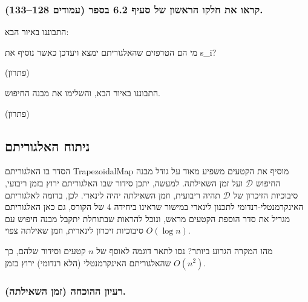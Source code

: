 \documentclass[
]{book}
\begin{document}
\hypertarget{ux5e7ux5e8ux5d0ux5d5-ux5d0ux5ea-ux5d7ux5dcux5e7ux5d5-ux5d4ux5e8ux5d0ux5e9ux5d5ux5df-ux5e9ux5dc-ux5e1ux5e2ux5d9ux5e3-6.2-ux5d1ux5e1ux5e4ux5e8-ux5e2ux5deux5d5ux5d3ux5d9ux5dd-128133.}{%
\subsubsection*{קראו את חלקו הראשון של סעיף 6.2 בספר (עמודים 128--133).}\label{ux5e7ux5e8ux5d0ux5d5-ux5d0ux5ea-ux5d7ux5dcux5e7ux5d5-ux5d4ux5e8ux5d0ux5e9ux5d5ux5df-ux5e9ux5dc-ux5e1ux5e2ux5d9ux5e3-6.2-ux5d1ux5e1ux5e4ux5e8-ux5e2ux5deux5d5ux5d3ux5d9ux5dd-128133.}}

התבוננו באיור הבא:

מי הם הטרפזים שהאלגוריתם ימצא ויעדכן כאשר נוסיף את s\_i?

(פתרון)

התבוננו באיור הבא, והשלימו את מבנה החיפוש.

(פתרון)

\hypertarget{alg-analysis}{%
\subsection{ניתוח האלגוריתם}\label{alg-analysis}}

הסדר בו האלגוריתם TrapezoidalMap מוסיף את הקטעים משפיע מאוד על גודל מבנה החיפוש \(\mathcal{D}\) ועל זמן השאילתה.
למעשה, יתכן סידור שבו האלגוריתם ירוץ בזמן ריבועי, סיבוכיות הזיכרון של \(\mathcal{D}\) תהיה ריבועית, וזמן השאילתה יהיה לינארי.
לכן, בדומה לאלגוריתם האינקרמנטלי-רנדומי לתכנון לינארי במישור שראינו ביחידה 4 של הקורס, גם כאן האלגוריתם מגריל את סדר הוספת הקטעים מראש, ונוכל להראות שבתוחלת יתקבל מבנה חיפוש עם סיבוכיות זיכרון לינארית, וזמן שאילתה צפוי \(O (\log n )\).

מהו המקרה הגרוע ביותר?
נסו לתאר דוגמה לאוסף של \(n\) קטעים וסידור שלהם, כך שהאלגוריתם האינקרמנטלי (הלא רנדומי) ירוץ בזמן \(O ( n^2 )\).

\hypertarget{ux5e8ux5e2ux5d9ux5d5ux5df-ux5d4ux5d4ux5d5ux5dbux5d7ux5d4-ux5d6ux5deux5df-ux5d4ux5e9ux5d0ux5d9ux5dcux5eaux5d4.}{%
\subsubsection*{רעיון ההוכחה (זמן השאילתה).}\label{ux5e8ux5e2ux5d9ux5d5ux5df-ux5d4ux5d4ux5d5ux5dbux5d7ux5d4-ux5d6ux5deux5df-ux5d4ux5e9ux5d0ux5d9ux5dcux5eaux5d4.}}
\end{document}
